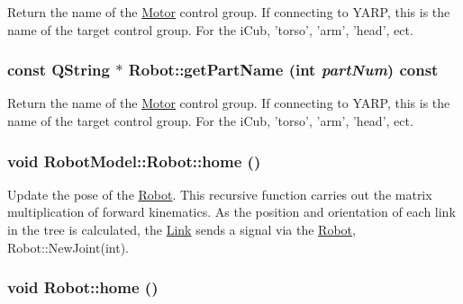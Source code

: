 Return the name of the \hyperlink{class_robot_model_1_1_motor}{Motor} control group. If connecting to YARP, this is the name of the target control group. For the iCub, 'torso', 'arm', 'head', ect. \hypertarget{class_robot_model_1_1_robot_a108ec79a213fbc7655595f1716150436}{
\subsubsection[{getPartName}]{\setlength{\rightskip}{0pt plus 5cm}const QString $\ast$ Robot::getPartName (int {\em partNum}) const}}
\label{class_robot_model_1_1_robot_a108ec79a213fbc7655595f1716150436}


Return the name of the \hyperlink{class_robot_model_1_1_motor}{Motor} control group. If connecting to YARP, this is the name of the target control group. For the iCub, 'torso', 'arm', 'head', ect. \hypertarget{class_robot_model_1_1_robot_a6238d22c6617eb9b56dba349851d6119}{
\subsubsection[{home}]{\setlength{\rightskip}{0pt plus 5cm}void RobotModel::Robot::home ()}}
\label{class_robot_model_1_1_robot_a6238d22c6617eb9b56dba349851d6119}


Update the pose of the \hyperlink{class_robot_model_1_1_robot}{Robot}. This recursive function carries out the matrix multiplication of forward kinematics. As the position and orientation of each link in the tree is calculated, the \hyperlink{class_robot_model_1_1_link}{Link} sends a signal via the \hyperlink{class_robot_model_1_1_robot}{Robot}, Robot::NewJoint(int). \hypertarget{class_robot_model_1_1_robot_a2fd7c2a0cd53593361f38f52de41d73c}{
\subsubsection[{home}]{\setlength{\rightskip}{0pt plus 5cm}void Robot::home ()}}
\label{class_robot_model_1_1_robot_a2fd7c2a0cd53593361f38f52de41d73c}


